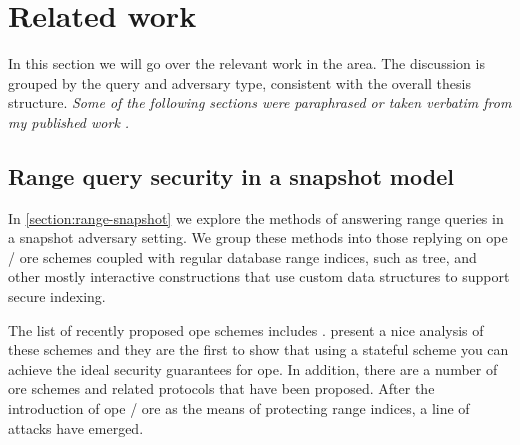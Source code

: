 \chapter{Related work}\label{section:related-work}
\thispagestyle{myheadings}

	In this section we will go over the relevant work in the area.
 	The discussion is grouped by the query and adversary type, consistent with the overall thesis structure.
	\emph{Some of the following sections were paraphrased or taken verbatim from my published work \cite{ore-benchmark-17,epsolute}.}

	\section{Range query security in a snapshot model}

		In \cref{section:range-snapshot} we explore the methods of answering range queries in a snapshot adversary setting.
		We group these methods into those replying on \acrshort{ope} / \acrshort{ore} schemes coupled with regular database range indices, such as \BPlus{} tree, and other mostly interactive constructions that use custom data structures to support secure indexing.

		The list of recently proposed \acrshort{ope} schemes includes \cite{ope-original, anti-tamper-dbs, bclo-ope, ope-leakage, ope-beyond-one-wayness, ope-early-fh-ope, ope-beyond-ideal-object, ope-mv-opes, fh-ope, ope-mv-popes, ope-multi-user, ope-note, ope-for-encrypted-dbs, ope-structure, ope-non-linear, ope-mdope, ope-outsourced-database, fh-ope-imporved-update}. %
		\textcite{ope-ideal-security-protocol} present a nice analysis of these schemes and they are the first to show that using a stateful scheme you can achieve the ideal security guarantees for \acrshort{ope}.
		In addition, there are a number of \acrshort{ore} schemes \cite{ore-original, clww-ore, lewi-wu-ore, parameter-hiding-ore, parameter-hiding-ore, ore-learning, ore-partial, ore-multi-client,  delegatable-ore, multi-client-ore} and related protocols \cite{ore-sorel} that have been proposed. %
		After the introduction of \acrshort{ope} / \acrshort{ore} as the means of protecting range indices, a line of attacks \cite{leakage-abuse-attacks-cash-15,attacks-what-else-revealed,inference-attacks-naveed-15, ore-file-injection-attack} have emerged.

